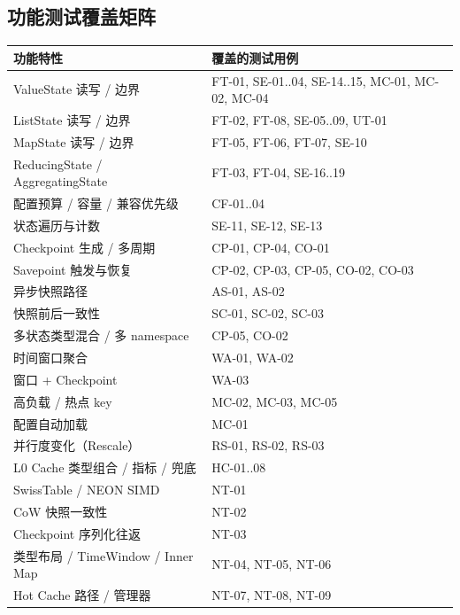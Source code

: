 \documentclass[a4paper,11pt]{article}
\begin{document}
\subsection{功能测试覆盖矩阵}

\begin{table}[H]
\centering
\small
\begin{tabularx}{\textwidth}{L{5.0cm} X}
\toprule
\textbf{功能特性} & \textbf{覆盖的测试用例} \\
\midrule
ValueState 读写 / 边界                & FT-01, SE-01..04, SE-14..15, MC-01, MC-02, MC-04 \\
ListState 读写 / 边界                 & FT-02, FT-08, SE-05..09, UT-01 \\
MapState 读写 / 边界                  & FT-05, FT-06, FT-07, SE-10 \\
ReducingState / AggregatingState      & FT-03, FT-04, SE-16..19 \\
配置预算 / 容量 / 兼容优先级           & CF-01..04 \\
状态遍历与计数                        & SE-11, SE-12, SE-13 \\
Checkpoint 生成 / 多周期              & CP-01, CP-04, CO-01 \\
Savepoint 触发与恢复                  & CP-02, CP-03, CP-05, CO-02, CO-03 \\
异步快照路径                          & AS-01, AS-02 \\
快照前后一致性                        & SC-01, SC-02, SC-03 \\
多状态类型混合 / 多 namespace         & CP-05, CO-02 \\
时间窗口聚合                          & WA-01, WA-02 \\
窗口 + Checkpoint                    & WA-03 \\
高负载 / 热点 key                     & MC-02, MC-03, MC-05 \\
配置自动加载                          & MC-01 \\
并行度变化（Rescale）                 & RS-01, RS-02, RS-03 \\
L0 Cache 类型组合 / 指标 / 兜底       & HC-01..08 \\
SwissTable / NEON SIMD                & NT-01 \\
CoW 快照一致性                        & NT-02 \\
Checkpoint 序列化往返                 & NT-03 \\
类型布局 / TimeWindow / Inner Map     & NT-04, NT-05, NT-06 \\
Hot Cache 路径 / 管理器               & NT-07, NT-08, NT-09 \\
\bottomrule
\end{tabularx}
\end{table}
\end{document}
